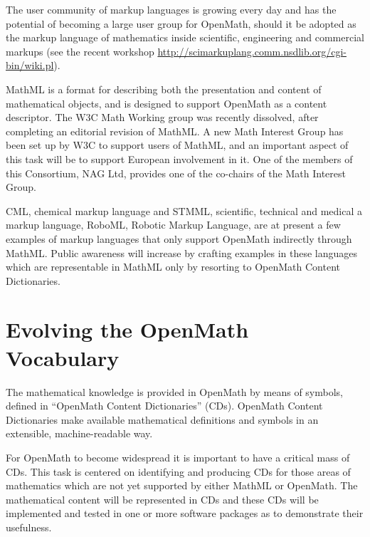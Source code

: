 \documentclass[draft]{artikel3}
\begin{document}
The user community of markup languages is growing every day and has
the potential of becoming a large user group for OpenMath, should it
be adopted as the markup language of mathematics inside scientific,
engineering and commercial markups (see the recent workshop
\url{http://scimarkuplang.comm.nsdlib.org/cgi-bin/wiki.pl}).

MathML is a format for describing both the presentation and content of
mathematical objects, and is designed to support OpenMath as a content
descriptor.  The W3C Math Working group was recently dissolved, after
completing an editorial revision of MathML.  A new Math Interest Group
has been set up by W3C to support users of MathML, and an important
aspect of this task will be to support European involvement in it.
One of the members of this Consortium, NAG Ltd, provides one of the
co-chairs of the Math Interest Group.

CML, chemical markup language and STMML, scientific, technical and
medical a markup language, RoboML, Robotic Markup Language, are at
present a few examples of markup languages that only support OpenMath
indirectly through MathML.  Public awareness will increase by crafting
examples in these languages which are representable in MathML only by
resorting to OpenMath Content Dictionaries.




\section{Evolving the OpenMath Vocabulary}
\label{sec:OCD}

The mathematical knowledge is provided in OpenMath by means of
symbols, defined in ``OpenMath Content Dictionaries'' (CDs).  OpenMath
Content Dictionaries make available mathematical definitions and
symbols in an extensible, machine-readable way.

For OpenMath to become widespread it is important to have a critical
mass of CDs. This task is centered on identifying and producing CDs
for those areas of mathematics which are not yet supported by either
MathML or OpenMath. The mathematical content will be represented in
CDs and these CDs will be implemented and tested in one or more
software packages as to demonstrate their usefulness.
\end{document}
